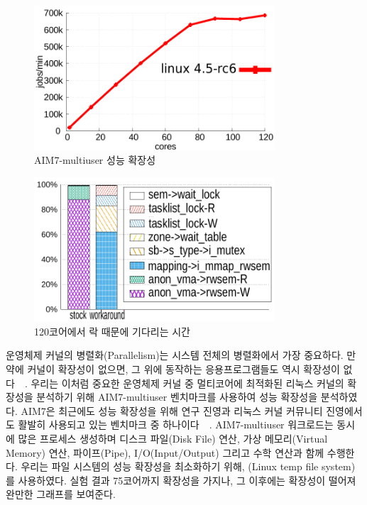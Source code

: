 
\begin{figure}[h]
    \centering
    \includegraphics[width=0.8\textwidth]{graph/aim7_default}
    \caption{AIM7-multiuser 성능 확장성}
  \label{fig:aim7_default}
\end{figure}

\begin{figure}[h]
    \centering
    \includegraphics[width=0.8\textwidth]{graph/lockstat}
    \caption{120코어에서 락 때문에 기다리는 시간}
  \label{fig:aim7_default}
\end{figure}

운영체제 커널의 병렬화(Parallelism)는 시스템 전체의 병렬화에서 가장 중요하다.
만약에 커널이 확장성이 없으면, 그 위에 동작하는 응용프로그램들도 역시 확장성이
없다~\cite{Clements15SCR}~\cite{Boyd-WickizerCorey}.
우리는 이처럼 중요한 운영체제 커널 중 멀티코어에 최적화된 리눅스 커널의 확장성을 분석하기 위해 
AIM7-multiuser 벤치마크를 사용하여 성능 확장성을 분석하였다.
AIM7은 최근에도 성능 확장성을 위해 연구 진영과 리눅스 커널 커뮤니티 진영에서도 활발히 사용되고 있는 
벤치마크 중 하나이다~\cite{Bueso2015STP}~\cite{Bueso2014MCS}.
AIM7-multiuser 워크로드는 동시에 많은 프로세스 생성하며 디스크 파일(Disk File) 연산, 가상 
메모리(Virtual Memory) 연산, 파이프(Pipe), I/O(Input/Output) 그리고 수학 연산과 함께 수행한다.
우리는 파일 시스템의 성능 확장성을 최소화하기 위해, (Linux temp file system)를 사용하였다.
실험 결과 75코어까지 확장성을 가지나, 그 이후에는 확장성이 떨어져 완만한 그래프를 보여준다. 

